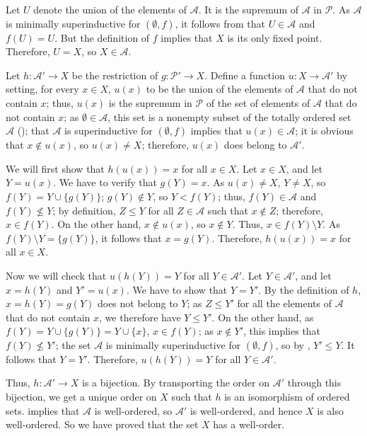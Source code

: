 \documentclass{article}
\begin{document}
\begin{solution}[\ref{exe:m0vdltb2}]
  \label{sol:7pp5s6s1}
  Let \(U\) denote the union of the elements of \(\mathcal{A}\).  It
  is the supremum of \(\mathcal{A}\) in \(\mathcal{P}\).  As
  \(\mathcal{A}\) is minimally superinductive for \((\emptyset, f)\),
  it follows from  that \(U \in \mathcal{A}\) and
  \(f(U) = U\).  But the definition of \(f\) implies that \(X\) is its
  only fixed point.  Therefore, \(U = X\), so \(X \in \mathcal{A}\).

  Let \(h : \mathcal{A}' \to X\) be the restriction of
  \(g : \mathcal{P}' \to X\).  Define a function
  \(u : X \to \mathcal{A}'\) by setting, for every \(x \in X\),
  \(u(x)\) to be the union of the elements of \(\mathcal{A}\) that do
  not contain \(x\); thus, \(u(x)\) is the supremum in \(\mathcal{P}\)
  of the set of elements of \(\mathcal{A}\) that do not contain \(x\);
  as \(\emptyset \in \mathcal{A}\), this set is a nonempty subset of
  the totally ordered set \(\mathcal{A}\) (); that
  \(\mathcal{A}\) is superinductive for \((\emptyset, f)\) implies
  that \(u(x) \in \mathcal{A}\); it is obvious that \(x \notin u(x)\),
  so \(u(x) \neq X\); therefore, \(u(x)\) does belong to
  \(\mathcal{A}'\).

  We will first show that \(h(u(x)) = x\) for all \(x \in X\).  Let
  \(x \in X\), and let \(Y = u(x)\).  We have to verify that
  \(g(Y) = x\).  As \(u(x) \neq X\), \(Y \neq X\), so
  \(f(Y) = Y \cup \{ g(Y) \}\); \(g(Y) \notin Y\), so \(Y < f(Y)\);
  thus, \(f(Y) \in \mathcal{A}\) and \(f(Y) \nleq Y\); by definition,
  \(Z \leq Y\) for all \(Z \in \mathcal{A}\) such that \(x \notin Z\);
  therefore, \(x \in f(Y)\).  On the other hand, \(x \notin u(x)\), so
  \(x \notin Y\).  Thus, \(x \in f(Y) \setminus Y\).  As
  \(f(Y) \setminus Y = \{ g(Y) \}\), it follows that \(x = g(Y)\).
  Therefore, \(h(u(x)) = x\) for all \(x \in X\).

  Now we will check that \(u(h(Y)) = Y\) for all
  \(Y \in \mathcal{A}'\).  Let \(Y \in \mathcal{A}'\), and let
  \(x = h(Y)\) and \(Y' = u(x)\).  We have to show that \(Y = Y'\).
  By the definition of \(h\), \(x = h(Y) = g(Y)\) does not belong to
  \(Y\); as \(Z \leq Y'\) for all the elements of \(\mathcal{A}\) that
  do not contain \(x\), we therefore have \(Y \leq Y'\).  On the other
  hand, as \(f(Y) = Y \cup \{ g(Y) \} = Y \cup \{ x \}\),
  \(x \in f(Y)\); as \(x \notin Y'\), this implies that
  \(f(Y) \nleq Y'\); the set \(\mathcal{A}\) is minimally
  superinductive for \((\emptyset, f)\), so by ,
  \(Y' \leq Y\).  It follows that \(Y = Y'\).  Therefore,
  \(u(h(Y)) = Y\) for all \(Y \in \mathcal{A}'\).

  Thus, \(h : \mathcal{A}' \to X\) is a bijection.  By transporting
  the order on \(\mathcal{A}'\) through this bijection, we get a
  unique order on \(X\) such that \(h\) is an isomorphism of ordered
  sets.   implies that \(\mathcal{A}\) is
  well-ordered, so \(\mathcal{A}'\) is well-ordered, and hence \(X\)
  is also well-ordered.  So we have proved that the set \(X\) has a
  well-order.
\end{solution}
\end{document}
